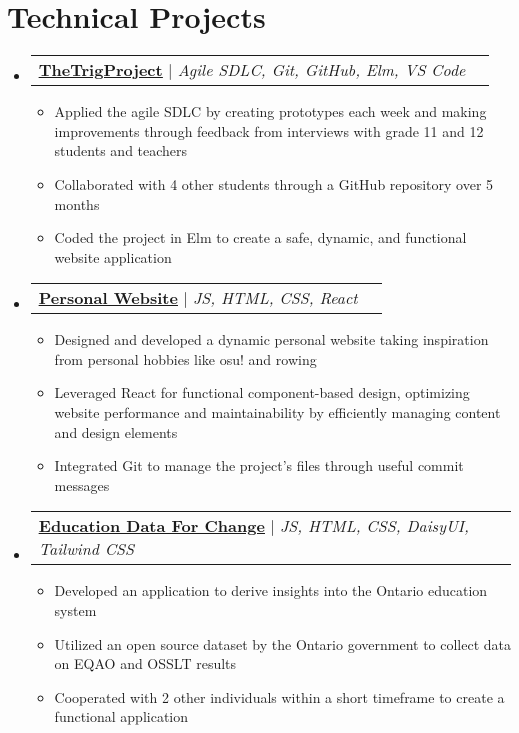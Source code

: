 \documentclass[letterpaper,11pt]{article}
\makeatletter
\newcommand{\resumeItem}[1]{
	\item\small{
		{#1 \vspace{-2pt}}
	}
}
\newcommand{\resumeProjectHeading}[2]{
	\item
	\begin{tabular*}{0.97\textwidth}{l@{\extracolsep{\fill}}r}
		\small#1 & #2 \\
	\end{tabular*}\vspace{-7pt}
}
\newcommand{\resumeSubHeadingListStart}{\begin{itemize}[leftmargin=0.15in,
			label={}]}
\newcommand{\resumeSubHeadingListEnd}{\end{itemize}}
\newcommand{\resumeItemListStart}{\begin{itemize}}
\newcommand{\resumeItemListEnd}{\end{itemize}\vspace{-5pt}}
\makeatother
\begin{document}
\section{Technical Projects}
\resumeSubHeadingListStart

\resumeProjectHeading{\href{https://github.com/youcefs21/TheTrigProject}{\underline{\textbf{TheTrigProject}}}
	$|$ \emph{Agile SDLC, Git, GitHub, Elm, VS Code}}{}
\resumeItemListStart
\resumeItem{Applied the agile SDLC by creating prototypes each week and making improvements through feedback from interviews with grade 11 and 12 students and teachers}
\resumeItem{Collaborated with 4 other students through a GitHub repository over 5 months}
\resumeItem{Coded the project in Elm to create a safe, dynamic, and functional website application}
\resumeItemListEnd

\resumeProjectHeading{\href{https://geon-youn.github.io/}{\underline{\textbf{Personal Website}}} $|$ \emph{JS, HTML, CSS, React}}{}
\resumeItemListStart
\resumeItem{Designed and developed a dynamic personal website taking inspiration from personal hobbies like osu! and rowing}
\resumeItem{Leveraged React for functional component-based design, optimizing website performance and maintainability by efficiently managing content and design elements}
\resumeItem{Integrated Git to manage the project's files through useful commit messages}
\resumeItemListEnd

\resumeProjectHeading{\href{https://github.com/owengretzinger/education-data-for-change}{\underline{\textbf{Education Data For Change}}} $|$ \emph{JS, HTML, CSS, DaisyUI, Tailwind CSS}}{}
\resumeItemListStart
\resumeItem{Developed an application to derive insights into the Ontario education system}
\resumeItem{Utilized an open source dataset by the Ontario government to collect data on EQAO and OSSLT results}
\resumeItem{Cooperated with 2 other individuals within a short timeframe to create a functional application}
\resumeItemListEnd
\resumeSubHeadingListEnd

\end{document}
